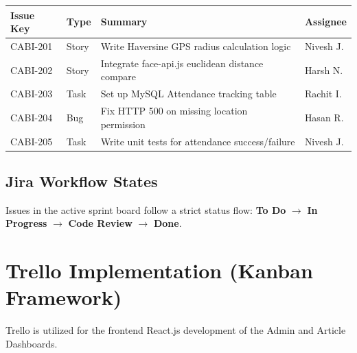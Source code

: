 \documentclass[12pt,a4paper]{article}
\begin{document}
\begin{center}
\small
\begin{tabularx}{\textwidth}{l l X l}
\toprule
\textbf{Issue Key} & \textbf{Type} & \textbf{Summary} & \textbf{Assignee} \\
\midrule
CABI-201 & Story & Write Haversine GPS radius calculation logic & Nivesh J. \\
CABI-202 & Story & Integrate face-api.js euclidean distance compare & Harsh N. \\
CABI-203 & Task & Set up MySQL Attendance tracking table & Rachit I. \\
CABI-204 & Bug & Fix HTTP 500 on missing location permission & Hasan R. \\
CABI-205 & Task & Write unit tests for attendance success/failure & Nivesh J. \\
\bottomrule
\end{tabularx}
\end{center}

\subsection{Jira Workflow States}
Issues in the active sprint board follow a strict status flow:
\textbf{To Do} $\rightarrow$ \textbf{In Progress} $\rightarrow$ \textbf{Code Review} $\rightarrow$ \textbf{Done}.

\vspace{1cm}
\begin{center}
\end{center}
\vspace{1cm}

\section{Trello Implementation (Kanban Framework)}
Trello is utilized for the frontend React.js development of the Admin and Article Dashboards.
\end{document}

